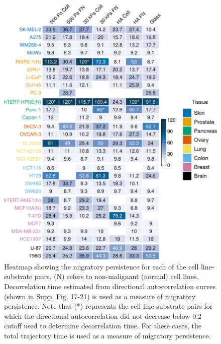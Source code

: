 \documentclass[11pt,letterpaper,english,oneside]{article} %
\begin{document}
\begin{figure}[H]
    \centering
    \includegraphics{../Figures/Supplementary_Figure16/supplementary_figure16.png}
    \caption{Heatmap showing the migratory persistence for each of the cell line-substrate pairs. 
    (N) refers to non-malignant (normal) cell lines. 
    Decorrelation time estimated from directional autocorrelation curves (shown in Supp. Fig. 17-21) is used as a measure of migratory persistence.
    Note that (*) represents the cell line-substrate pairs for which the directional autocorrelation did not decrease below 0.2 cutoff used to determine 
    decorrelation time. For these cases, the total trajectory time is used as a measure of migratory persistence.} 
    \label{fig:fig16}
\end{figure}
\end{document}
